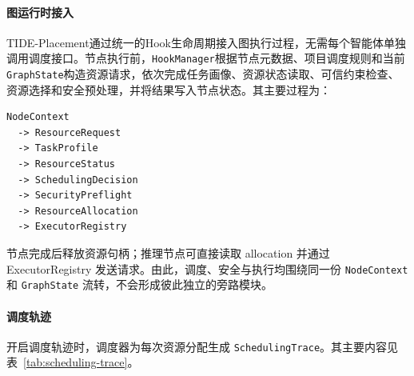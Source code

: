 




\paragraph{图运行时接入}

TIDE-Placement通过统一的Hook生命周期接入图执行过程，无需每个智能体单独调用调度接口。节点执行前，\texttt{HookManager}根据节点元数据、项目调度规则和当前
\texttt{GraphState}构造资源请求，依次完成任务画像、资源状态读取、可信约束检查、资源选择和安全预处理，并将结果写入节点状态。其主要过程为：

\begin{verbatim}
NodeContext
  -> ResourceRequest
  -> TaskProfile
  -> ResourceStatus
  -> SchedulingDecision
  -> SecurityPreflight
  -> ResourceAllocation
  -> ExecutorRegistry
\end{verbatim}

节点完成后释放资源句柄；推理节点可直接读取 allocation 并通过 ExecutorRegistry 发送请求。由此，调度、安全与执行均围绕同一份 \texttt{NodeContext} 和 \texttt{GraphState} 流转，不会形成彼此独立的旁路模块。

\paragraph{调度轨迹}
开启调度轨迹时，调度器为每次资源分配生成
\texttt{SchedulingTrace}。其主要内容见表~\ref{tab:scheduling-trace}。

